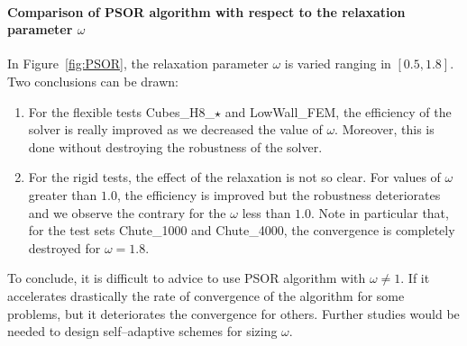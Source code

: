 \paragraph{Comparison of {\sf PSOR}  algorithm with respect to  the relaxation parameter $\omega$}

In Figure~\ref{fig:PSOR},  the relaxation parameter $\omega$ is varied ranging in $[0.5,1.8]$.  Two conclusions can be drawn:
\begin{enumerate}
\item For the flexible tests Cubes\_H8\_$\star$ and  LowWall\_FEM, the efficiency of the solver is really improved as we decreased the value of $\omega$. Moreover, this is done without destroying the robustness of the solver.
\item For the rigid tests, the effect of the relaxation is not so clear. For values of $\omega$ greater than $1.0$, the efficiency is improved but the robustness deteriorates and we observe the contrary for the  $\omega$  less than $1.0$. Note in particular that, for the test sets Chute\_1000 and Chute\_4000, the convergence is completely destroyed for $\omega = 1.8$.
\end{enumerate}
To conclude, it is difficult to advice to use PSOR algorithm with $\omega\neq 1$. If it accelerates drastically the rate of convergence of the algorithm for some problems, but it deteriorates the convergence for others. Further studies would be needed to design self--adaptive schemes for sizing $\omega$.

